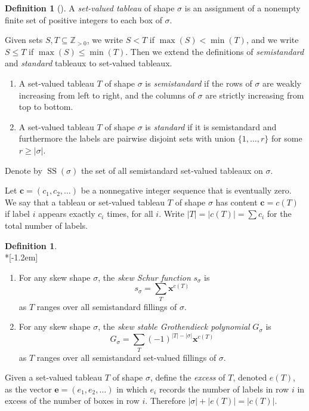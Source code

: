 \documentclass[11pt]{article}
\theoremstyle{definition}
\newtheorem{defi}[theorem]{Definition}
\newcommand{\ZZ}{\mathbb{Z}}
\DeclareMathOperator{\Semi}{SS}
\newcommand{\bfc}{\mathbf{c}}
\newcommand{\bfe}{\mathbf{e}}
\begin{document}
\begin{defi}[\cite{buch-littlewood-richardson}] \label{def:svt}
A \emph{set-valued tableau} of shape $\sigma$ is an assignment of a nonempty finite set of positive integers to each box of $\sigma$. 

Given sets $S,T\subseteq \ZZ_{>0}$, we write $S<T$ if $\max(S)<\min(T)$, and we write $S\le T$ if $\max(S)\le\min(T)$. Then we extend the definitions of \emph{semistandard} and \emph{standard} tableaux to set-valued tableaux.
\begin{enumerate}
\item \label{it:sstd}A set-valued tableau $T$ of shape $\sigma$ is \emph{semistandard} if the rows of $\sigma$ are weakly increasing from left to right, and the columns of $\sigma$ are strictly increasing from top to bottom.
\item \label{it:std} A set-valued tableau $T$ of shape $\sigma$ is \emph{standard} if it is semistandard and furthermore the labels are pairwise disjoint sets with union $\{1,\ldots,r\}$ for some $r \ge |\sigma|$.
\end{enumerate}
Denote by $\Semi(\sigma)$ the set of all semistandard set-valued tableaux on $\sigma$.
\end{defi}


Let $\bfc=(c_1,c_2,\ldots)$ be a nonnegative integer sequence that is eventually zero. We say that a tableau or set-valued tableau $T$ of shape $\sigma$ has content $\bfc = c(T)$ if label $i$ appears exactly $c_i$ times, for all $i$. 
Write $|T| = |c(T)| = \sum c_i$ for the total number of labels.

\begin{defi} \label{def:schur-groth}\ \\*[-1.2em]
\begin{enumerate}
\item\label{defi2.4_1}
For any skew shape $\sigma$, the \emph{skew Schur function} $s_\sigma$ is
\[
s_\sigma =\sum_T {\mathbf{x}}^{c(T)}
\]
as $T$ ranges over all semistandard fillings of $\sigma.$
\item\label{defi2.4_2}
For any skew shape $\sigma$, the \emph{skew stable Grothendieck polynomial} $G_\sigma$ is
\[
G_\sigma =\sum_T (-1)^{|T|-|\sigma|}{\mathbf{x}}^{c(T)}
\]
as $T$ ranges over all semistandard set-valued fillings of $\sigma.$
\end{enumerate}
\end{defi}

Given a set-valued tableau $T$ of shape $\sigma$, define the \emph{excess} of $T$, denoted $e(T)$, as the vector $\bfe = (e_1,e_2,\ldots)$ in which $e_i$ records the number of labels in row $i$ in excess of the number of boxes in row $i$. Therefore $|\sigma|+|e(T)|=|c(T)|$. 
\end{document}
